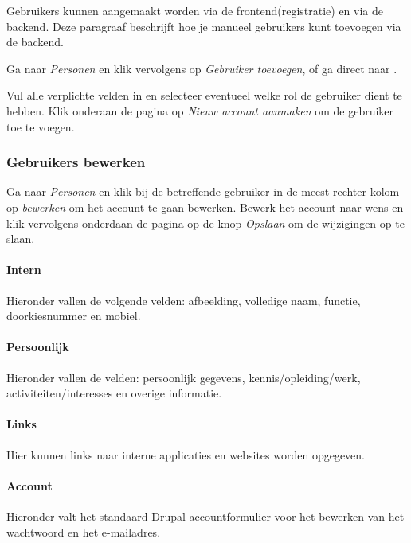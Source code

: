 Gebruikers kunnen aangemaakt worden via de frontend(registratie) en via de backend. Deze paragraaf beschrijft hoe je manueel gebruikers kunt toevoegen via de backend. 

Ga naar \emph{Personen} en klik vervolgens op \emph{Gebruiker toevoegen}, of ga direct naar .

Vul alle verplichte velden in en selecteer eventueel welke rol de gebruiker dient te hebben.
Klik onderaan de pagina op \emph{Nieuw account aanmaken} om de gebruiker toe te voegen.

\subsubsection{Gebruikers bewerken}

Ga naar \emph{Personen} en klik bij de betreffende gebruiker in de meest rechter kolom op \emph{bewerken} om het account te gaan bewerken. 
Bewerk het account naar wens en klik vervolgens onderdaan de pagina op de knop \emph{Opslaan} om de wijzigingen op te slaan.

\paragraph{Intern}

Hieronder vallen de volgende velden: afbeelding, volledige naam, functie, doorkiesnummer en mobiel.

\paragraph{Persoonlijk}

Hieronder vallen de velden: persoonlijk gegevens, kennis/opleiding/werk, activiteiten/interesses en overige informatie.

\paragraph{Links}

Hier kunnen links naar interne applicaties en websites worden opgegeven. 

\paragraph{Account}

Hieronder valt het standaard Drupal accountformulier voor het bewerken van het wachtwoord en het e-mailadres.

